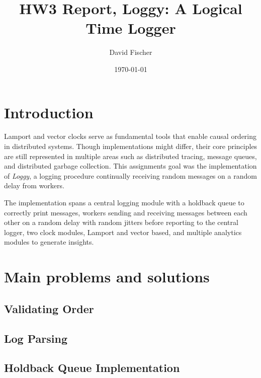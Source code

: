 \documentclass[a4paper, 11pt]{article}
\title{HW3 Report, Loggy: A Logical Time Logger}
\author{David Fischer}
\date{\today{}}
\begin{document}
\maketitle

\section{Introduction}
Lamport and vector clocks serve as fundamental tools that enable causal ordering in distributed systems. Though implementations might differ, their core principles are still represented in multiple areas such as distributed tracing, message queues, and distributed garbage collection.
This assignments goal was the implementation of \textit{Loggy}, a logging procedure continually receiving random messages on a random delay from workers.

The implementation spans a central logging module with a holdback queue to correctly print messages, workers sending and receiving messages between each other on a random delay with random jitters before reporting to the central logger, two clock modules, Lamport and vector based, and multiple analytics modules to generate insights.

\section{Main problems and solutions}

\subsection{Validating Order}




\subsection{Log Parsing}


\subsection{Holdback Queue Implementation}

\end{document}

